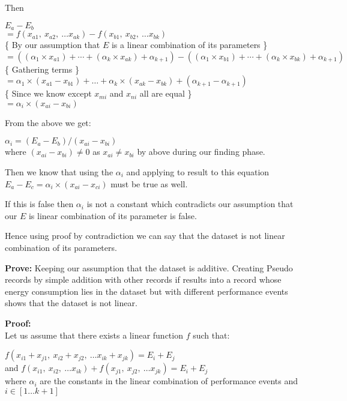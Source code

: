Then

\(E_a - E_b\)\\
\(= f(x_{a1},\ x_{a2},\ \ldots x_{ak}) - f(x_{b1},\ x_{b2},\ \ldots x_{bk})\)\\
{\footnotesize \{ By our assumption that \(E\) is a linear combination of its parameters \} }\\
\(= ((\alpha _1\times x_{a1}) + \cdots + (\alpha_{k}\times x_{ak}) + \alpha_{k+1}) - ((\alpha _1\times x_{b1}) + \cdots + (\alpha_k\times x_{bk}) + \alpha_{k+1})\)\\
{\footnotesize \{ Gathering terms \}}\\
\(= \alpha_1 \times (x_{a1} - x_{b1}) + \ldots + \alpha_k \times (x_{ak} - x_{bk}) + (\alpha_{k+1} - \alpha_{k+1})\)\\
{\footnotesize \{ Since we know except \(x_{mi}\) and \(x_{ni}\) all are equal \}}\\
\(= \alpha_i \times (x_{ai} - x_{bi})\)

From the above we get:

\(\alpha_i = (E_a - E_b)/(x_{ai} - x_{bi})\)\\
where \((x_{ai} - x_{bi}) \neq 0\) as \(x_{ai} \neq x_{bi}\) by above during our finding phase.

Then we know that using the \(\alpha_i\) and applying to result to this equation \(E_a - E_c = \alpha_i \times (x_{ai} - x_{ci})\) must be true as well.

If this is false then \(\alpha_i\) is not a constant which contradicts our assumption that our \(E\) is linear combination of its parameter is false.

Hence using proof by contradiction we can say that the dataset is not linear combination of its parameters.

\textbf{Prove:} Keeping our assumption that the dataset is additive. Creating Pseudo records by simple addition with other records if results into a record whose energy consumption lies in the dataset but with different performance events shows that the dataset is not linear.

\textbf{Proof:}\\
Let us assume that there exists a linear function \(f\) such that:

\(f(x_{i1} + x_{j1},\ x_{i2}+ x_{j2},\ \ldots x_{ik} + x_{jk}) = E_i + E_j\)\\ and 
\(f(x_{i1},\ x_{i2},\ \ldots x_{ik}) + f(x_{j1},\ x_{j2},\ \ldots x_{jk}) = E_i + E_j\)\\
where \(\alpha_i\) are the constants in the linear combination of performance events and \(i\in[1\ldots k+1]\)

